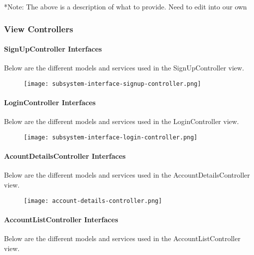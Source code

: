 \documentclass[12pt]{article}
\begin{document}
*Note: The above is a description of what to provide. Need to edit into our own
\subsubsection{View Controllers}

\paragraph{SignUpController Interfaces}

Below are the different models and services used in the SignUpController view.

\begin{figure}[H]
\texttt{[image: subsystem-interface-signup-controller.png]}
\end{figure}

\clearpage

\paragraph{LoginController Interfaces}

Below are the different models and services used in the LoginController view.

\begin{figure}[H]
\texttt{[image: subsystem-interface-login-controller.png]}
\end{figure}

\clearpage

\paragraph{AcountDetailsController Interfaces}

Below are the different models and services used in the AccountDetailsController view.

\begin{figure}[H]
\texttt{[image: account-details-controller.png]}
\end{figure}

\clearpage

\paragraph{AccountListController Interfaces}

Below are the different models and services used in the AccountListController view.
\end{document}
